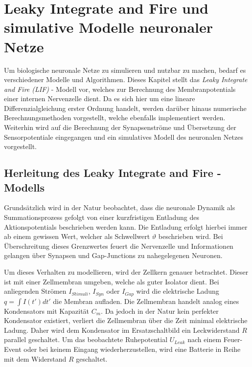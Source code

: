 %
\chapter{Leaky Integrate and Fire und simulative Modelle neuronaler Netze}
\label{chap:lif}
%

	Um biologische neuronale Netze zu simulieren und nutzbar zu machen, bedarf es verschiedener Modelle und Algorithmen. Dieses Kapitel stellt das \textit{Leaky Integrate and Fire (LIF)} - Modell vor, welches zur Berechnung des Membranpotentials einer internen Nervenzelle dient. Da es sich hier um eine lineare Differenzialgleichung erster Ordnung handelt, werden darüber hinaus numerische Berechnungsmethoden vorgestellt, welche ebenfalls implementiert werden. Weiterhin wird auf die Berechnung der Synapsenströme und Übersetzung der Sensorpotentiale eingegangen und ein simulatives Modell des neuronalen Netzes vorgestellt.

\section{Herleitung des Leaky Integrate and Fire - Modells}
\label{sec:lif_model}
	Grundsätzlich wird in der Natur beobachtet, dass die neuronale Dynamik als Summationsprozess gefolgt von einer kurzfristigen Entladung des Aktionspotentials beschrieben werden kann. Die Entladung erfolgt hierbei immer ab einem gewissen Wert, welcher als Schwellwert $\vartheta$ beschrieben wird. Bei Überschreitung dieses Grenzwertes \glqq feuert\grqq{} die Nervenzelle und Informationen gelangen über Synapsen und Gap-Junctions zu nahegelegenen Neuronen.
	
	Um dieses Verhalten zu modellieren, wird der Zellkern genauer betrachtet. Dieser ist mit einer Zellmembran umgeben, welche als guter Isolator dient. Bei anliegenden Strömen $I_{Stimuli}$, $I_{Syn}$ oder $I_{Gap}$ wird die elektrische Ladung $q = \int I(t')dt'$ die Membran aufladen. Die Zellmembran handelt analog eines Kondensators mit Kapazität $C_m$. Da jedoch in der Natur kein perfekter Kondensator existiert, verliert die Zellmembran über die Zeit minimal elektrische Ladung. Daher wird dem Kondensator im Ersatzschaltbild ein Leckwiderstand $R$ parallel geschaltet. Um das beobachtete Ruhepotential $U_{Leak}$ nach einem Feuer-Event oder bei keinem Eingang wiederherzustellen, wird eine Batterie in Reihe mit dem Widerstand $R$ geschaltet.
	
